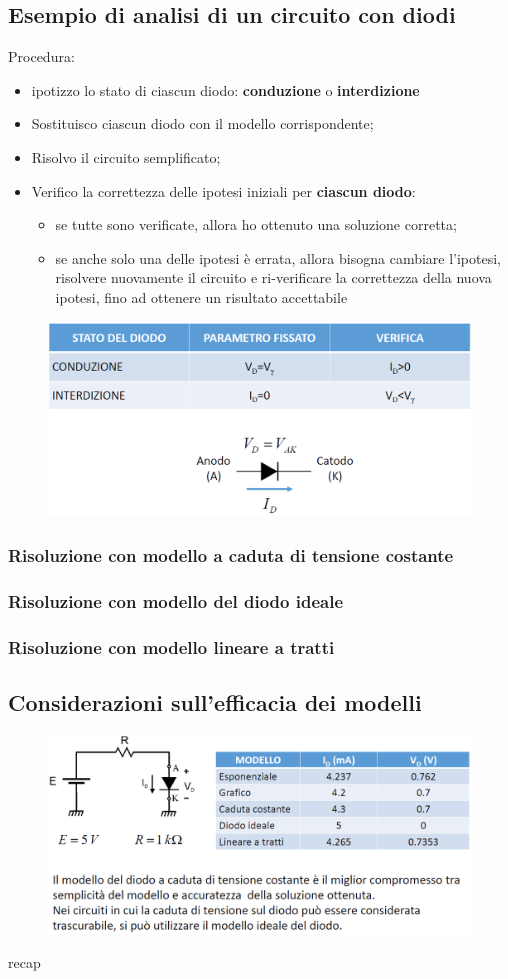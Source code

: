 \documentclass[11pt,a4paper,]{article}
\begin{document}
\subsection{Esempio di analisi di un circuito con diodi}
Procedura:
\begin{itemize}
    \item ipotizzo lo stato di ciascun diodo: \textbf{conduzione} o \textbf{interdizione}
    \item Sostituisco ciascun diodo con il modello corrispondente;
    \item Risolvo il circuito semplificato;
    \item Verifico la correttezza delle ipotesi iniziali per \textbf{ciascun diodo}:
    \begin{itemize}
        \item se tutte sono verificate, allora ho ottenuto una soluzione corretta;
        \item se anche solo una delle ipotesi è errata, allora bisogna cambiare l'ipotesi, risolvere nuovamente il circuito e ri-verificare la correttezza della nuova ipotesi, fino ad ottenere un risultato accettabile
    \end{itemize}
\end{itemize}
\begin{figure}[H]
    \centering
    \includegraphics[width=0.5\linewidth]{img/param verifica.png}
\end{figure}
\subsubsection{Risoluzione con modello a caduta di tensione costante}
\subsubsection{Risoluzione con modello del diodo ideale}
\subsubsection{Risoluzione con modello lineare a tratti}
\subsection{Considerazioni sull'efficacia dei modelli}
\begin{figure}[H]
    \centering
    \includegraphics[width=0.5\linewidth]{img/efficacia modelli.png}
\end{figure}
recap
\end{document}
